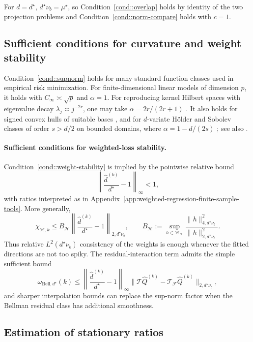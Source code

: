 \documentclass{article}
\theoremstyle{plain}
\theoremstyle{definition}
\theoremstyle{remark}
\begin{document}
For \(d=d^\star\), \(d^\star\nu_b=\mu^\star\), so
Condition~\ref{cond::overlap} holds by identity of the two projection problems
and Condition~\ref{cond::norm-compare} holds with \(c=1\).

\subsection{Sufficient conditions for curvature and weight stability}
\label{app:c3-examples}

Condition~\ref{cond::supnorm} holds for many standard function classes used in
empirical risk minimization. For finite-dimensional linear models of dimension
\(p\), it holds with \(C_\infty \asymp \sqrt{p}\) and \(\alpha=1\). For
reproducing kernel Hilbert spaces with eigenvalue decay
\(\lambda_j \asymp j^{-2r}\), one may take
\(\alpha = 2r/(2r+1)\) \citep[Lemma~5.1]{mendelson2010regularization}. It also
holds for signed convex hulls of suitable bases
\citep[Lemma~2]{van2014uniform}, and for \(d\)-variate Hölder and Sobolev
classes of order \(s>d/2\) on bounded domains, where
\(\alpha = 1-d/(2s)\) \citep[Lemma~4]{bibaut2021sequential}; see also
\citep{adams2003sobolev,triebel2006theory}.

\paragraph{Sufficient conditions for weighted-loss stability.}
Condition~\ref{cond::weight-stability} is implied by the pointwise relative
bound
\[
\left\|\frac{\widehat d^{(k)}}{d^\star}-1\right\|_\infty<1,
\]
with ratios interpreted as in
Appendix~\ref{app:weighted-regression-finite-sample-tools}. More generally,
\[
\chi_{\mathcal H,k}
\le
B_{\mathcal H}
\left\|\frac{\widehat d^{(k)}}{d^\star}-1\right\|_{2,d^\star\nu_b},
\qquad
B_{\mathcal H}
:=
\sup_{h\in\mathcal H_{\mathcal F}}
\frac{\|h\|_{4,d^\star\nu_b}^2}{\|h\|_{2,d^\star\nu_b}^2}.
\]
Thus relative \(L^2(d^\star\nu_b)\) consistency of the weights is enough whenever
the fitted directions are not too spiky. The residual-interaction term admits
the simple sufficient bound
\[
\omega_{\mathrm{Bell},d^\star}(k)
\le
\left\|\frac{\widehat d^{(k)}}{d^\star}-1\right\|_\infty
\|\mathcal T\widehat Q^{(k)}
-\mathcal T_{\mathcal F}\widehat Q^{(k)}\|_{2,d^\star\nu_b},
\]
and sharper interpolation bounds can replace the sup-norm factor when the
Bellman residual class has additional smoothness.

\subsection{Estimation of stationary ratios}
\label{app:ratio-estimation}
\end{document}

